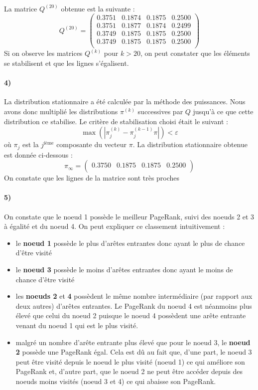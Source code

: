 \documentclass[a4paper,titlepage]{report}
\begin{document}
\paragraph{}
La matrice $Q^{(20)}$ obtenue est la suivante :
\[
Q^{(20)} = 
\begin{pmatrix}
 0.3751 & 0.1874 & 0.1875 & 0.2500\\
 0.3751 & 0.1877 & 0.1874 & 0.2499\\
 0.3749 & 0.1875 & 0.1875 & 0.2500\\
 0.3749 & 0.1875 & 0.1875 & 0.2500\\
\end{pmatrix}
\]
Si on observe les matrices $Q^{(k)}$ pour $k> 20$, on peut constater que les éléments se stabilisent et que les lignes s'égalisent. 
\paragraph{4)} La distribution stationnaire a été calculée par la méthode des puissances. Nous avons donc multiplié les distributions $\pi^{(k)}$ successives par $Q$ jusqu'à ce que cette distribution ce stabilise. Le critère de stabilisation choisi était le suivant : 
\[
\max\left(\left|\pi_j^{(k)} - \pi_j^{(k - 1)}\pi\right|\right) < \varepsilon
\]
où $\pi_j$ est la $j^{\text{ième}}$ composante du vecteur $\pi$. La distribution stationnaire obtenue est donnée ci-dessous :
\[
\pi_\infty = 
\begin{pmatrix}
0.3750 &
0.1875 &
0.1875 &
0.2500 \\
\end{pmatrix}
\]
On constate que les lignes de la matrice sont très proches
\paragraph{5)} On constate que le noeud 1 possède le meilleur PageRank, suivi des noeuds 2 et 3 à égalité et du noeud 4. On peut expliquer ce classement intuitivement : 
\begin{itemize}
	\item le \textbf{noeud 1} possède le plus d'arêtes entrantes donc ayant le plus de chance d'être visité
	\item le \textbf{noeud 3} possède le moins d'arêtes entrantes donc ayant le moins de chance d'être visité
	\item les \textbf{noeuds 2} et \textbf{4} possèdent le même nombre intermédiaire (par rapport aux deux autres) d'arêtes entrantes. Le PageRank du noeud 4 est néanmoins plus élevé que celui du noeud 2 puisque le noeud 4 possèdent une arête entrante venant du noeud 1 qui est le plus visité.
	\item malgré un nombre d'arête entrante plus élevé que pour le noeud 3, le \textbf{noeud 2} possède une PageRank égal. Cela est dû au fait que, d'une part, le noeud 3 peut être visité depuis le noeud le plus visité (noeud 1) ce qui améliore son PageRank et, d'autre part, que le noeud 2 ne peut être accéder depuis des noeuds moins visités (noeud 3 et 4) ce qui abaisse son PageRank. 
\end{itemize} 
\end{document}

